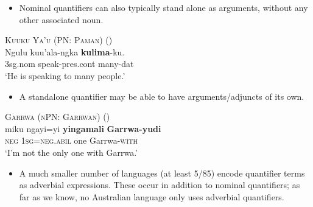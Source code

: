 \documentclass{article}
\makeatletter
\newcommand{\ofy}{/85} %
\makeatother
\begin{document}
\begin{itemize}
\item Nominal quantifiers can also typically stand alone as arguments, without any other associated noun. %
\end{itemize}

\begin{exe}
\ex \textsc{Kuuku Ya'u (PN: Paman)} (\citealt[15]{thompson88})\\
\gll Ngulu         kuu'ala-ngka           \textbf{kulima}-ku.\\
3{\sc sg.nom} speak-{\sc pres.cont} many-{\sc dat}\\
\glt `He is speaking to many people.'
\end{exe}

\begin{itemize}
\item A standalone quantifier may be able to have arguments/adjuncts of its own.
\end{itemize}
\begin{exe}
  \ex \textsc{Garrwa (nPN: Garrwan)} (\citealt[53]{mushin12})\\
  \gll miku ngayi=yi \textbf{yingamali} \textbf{Garrwa-yudi}\\
  \textsc{neg} 1\textsc{sg}=\textsc{neg.abil} one Garrwa-\textsc{with}\\
  \glt `I'm not the only one with Garrwa.'
\end{exe}

\begin{itemize}
    \item A much smaller number of languages (at least 5\ofy) encode quantifier terms as adverbial expressions. These occur in addition to nominal quantifiers; as far as we know, no Australian language only uses adverbial quantifiers.
\end{itemize}
\end{document}
